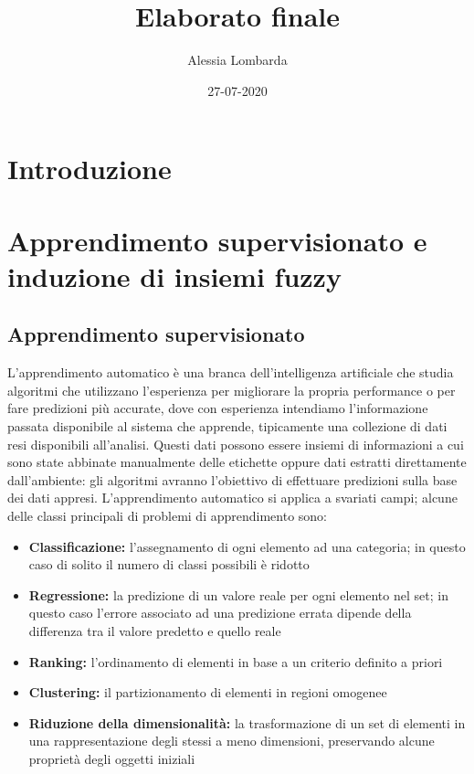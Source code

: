 \documentclass{article}
\title{Elaborato finale}
\date{27-07-2020}
\author{Alessia Lombarda}
\begin{document}
	\begin{titlepage}
		
	\end{titlepage}
	
	\tableofcontents
	\newpage
	\section{Introduzione}
	\section{Apprendimento supervisionato e induzione di insiemi fuzzy}
	\subsection{Apprendimento supervisionato}
	L'apprendimento automatico è una branca dell'intelligenza artificiale che studia algoritmi che utilizzano l'esperienza per migliorare la propria performance o per fare predizioni più accurate, dove con esperienza intendiamo l'informazione passata disponibile al sistema che apprende, tipicamente una collezione di dati resi disponibili all'analisi. Questi dati possono essere insiemi di informazioni a cui sono state abbinate manualmente delle etichette oppure dati estratti direttamente dall'ambiente: gli algoritmi avranno l'obiettivo di effettuare predizioni sulla base dei dati appresi.
	L'apprendimento automatico si applica a svariati campi; alcune delle classi principali di problemi di apprendimento sono:
	\begin{itemize}
		\item\textbf{Classificazione:} l'assegnamento di ogni elemento ad una categoria; in questo caso di solito il numero di classi possibili è ridotto
		\item\textbf{Regressione:} la predizione di un valore reale per ogni elemento nel set; in questo caso l'errore associato ad una predizione errata dipende della differenza tra il valore predetto e quello reale
		\item\textbf{Ranking:} l'ordinamento di elementi in base a un criterio definito a priori
		\item\textbf{Clustering:} il partizionamento di elementi in regioni omogenee
		\item\textbf{Riduzione della dimensionalità:} la trasformazione di un set di elementi in una rappresentazione degli stessi a meno dimensioni, preservando alcune proprietà degli oggetti iniziali
	\end{itemize}
\end{document}
